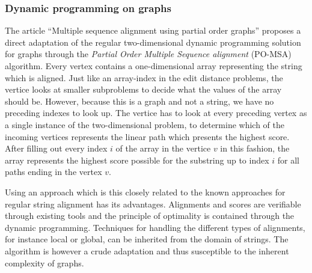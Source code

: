\documentclass[thesis.tex]{subfiles}
\begin{document}
\subsubsection{Dynamic programming on graphs}
The article ``Multiple sequence alignment using partial order graphs'' proposes a direct adaptation of the regular two-dimensional dynamic programming solution for graphs through the \textit{Partial Order Multiple Sequence alignment} (PO-MSA) algorithm. Every vertex contains a one-dimensional array representing the string which is aligned. Just like an array-index in the edit distance problems, the vertice looks at smaller subproblems to decide what the values of the array should be. However, because this is a graph and not a string, we have no preceding indexes to look up. The vertice has to look at every preceding vertex as a single instance of the two-dimensional problem, to determine which of the incoming vertices represents the linear path which presents the highest score. After filling out every index $i$ of the array in the vertice $v$ in this fashion, the array represents the highest score possible for the substring up to index $i$ for all paths ending in the vertex $v$.\\
\par\noindent
Using an approach which is this closely related to the known approaches for regular string alignment has its advantages. Alignments and scores are verifiable through existing tools and the principle of optimality is contained through the dynamic programming. Techniques for handling the different types of alignments, for instance local or global, can be inherited from the domain of strings. The algorithm is however a crude adaptation and thus susceptible to the inherent complexity of graphs.
\label{sec:po_msa}
\end{document}
